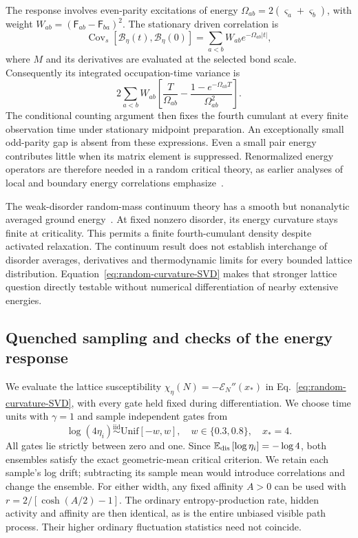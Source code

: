 \documentclass[aps,pre,reprint,amsmath,amssymb,longbibliography,floatfix]{revtex4-2}
\newcommand{\E}{\mathbb E}
\begin{document}
The response involves even-parity excitations of energy
$\Omega_{ab}=2(\varsigma_a+\varsigma_b)$, with weight
$W_{ab}=(\mathsf F_{ab}-\mathsf F_{ba})^2$. The stationary driven correlation is
\begin{equation}
 \operatorname{Cov}_s\left[\mathcal B_\eta(t),\mathcal B_\eta(0)\right]
 =\sum_{a<b}W_{ab}e^{-\Omega_{ab}|t|},
 \label{eq:random-energy-correlation}
\end{equation}
where $M$ and its derivatives are evaluated at the selected bond scale.
Consequently its integrated occupation-time variance is
\begin{equation}
 2\sum_{a<b}W_{ab}\left[
 \frac{T}{\Omega_{ab}}-
 \frac{1-e^{-\Omega_{ab}T}}{\Omega_{ab}^2}\right].
 \label{eq:random-integrated-response}
\end{equation}
The conditional counting argument then fixes the fourth cumulant at
every finite observation time under stationary midpoint preparation.
An exceptionally small odd-parity gap is absent from these expressions.
Even a small pair energy contributes little when its matrix element is
suppressed. Renormalized energy operators are therefore needed in a
random critical theory, as earlier analyses of local and boundary energy
correlations emphasize~\cite{IgloiJuhaszRieger1999Griffiths,RefaelFisher2004Energy}.

The weak-disorder random-mass continuum theory has a smooth but
nonanalytic averaged ground energy~\cite{BunderMcKenzie1999}. At fixed
nonzero disorder, its energy curvature stays finite at criticality.
This permits a finite fourth-cumulant density despite activated
relaxation. The continuum result does not establish interchange of
disorder averages, derivatives and thermodynamic limits for every
bounded lattice distribution. Equation~\eqref{eq:random-curvature-SVD}
makes that stronger lattice question directly testable without numerical
differentiation of nearby extensive energies.

\subsection{Quenched sampling and checks of the energy response}
\label{app:disorder-numerics}
We evaluate  the lattice susceptibility
$\chi_\eta(N)=-\mathscr E_N''(x_*)$ in
Eq.~\eqref{eq:random-curvature-SVD}, with every gate held fixed during
differentiation. We choose time units with $\gamma=1$ and sample independent gates from 
\begin{equation}
 \log(4\eta_i)\overset{\mathrm{iid}}\sim\mathrm{Unif}\left[-w,w\right],\quad
 w\in\{0.3,0.8\},\quad x_*=4.
 \label{eq:disorder-numerical-ensemble}
\end{equation}
All gates lie strictly between zero and one. Since
$\E_{\rm dis}\left[\log\eta_i\right]=-\log4$, both ensembles satisfy the exact
geometric-mean critical criterion. We retain each sample's log drift;
subtracting its sample mean would introduce correlations and change
the ensemble. For either width, any fixed affinity $A>0$ can be used
with $r=2/\left[\cosh(A/2)-1\right]$. The ordinary entropy-production rate,
hidden activity and affinity are then identical, as is the entire
unbiased visible path process. Their higher ordinary fluctuation
statistics need not coincide.
\end{document}
